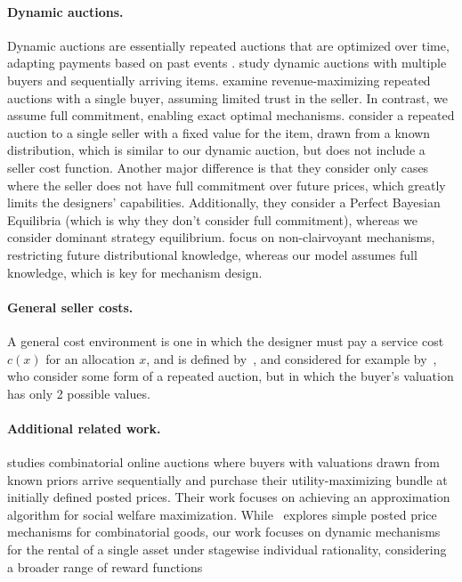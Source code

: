 \documentclass[11pt,letterpaper]{article}
\theoremstyle{plain}
\begin{document}
\paragraph{Dynamic auctions.} Dynamic auctions are essentially repeated auctions that are optimized over time, adapting payments based on past events \cite{bergemann2019dynamic,bergemann2010dynamic}. \cite{MirrokniLTZ19} study dynamic auctions with multiple buyers and sequentially arriving items.
 \cite{0001DMS18}  examine revenue-maximizing repeated auctions with a single buyer, assuming limited trust in the seller. In contrast, we assume full commitment, enabling exact optimal mechanisms.
\cite{DevanurPS15} consider a repeated auction to a single seller with a fixed value for the item, drawn from a known distribution, which is similar to our dynamic auction, but does not include a seller cost function. Another major difference is that they consider only cases where the seller does not have full commitment over future prices, which greatly limits the designers' capabilities. Additionally, they consider a Perfect Bayesian Equilibria (which is why they don't consider full commitment), whereas we consider dominant strategy equilibrium.  \cite{MirrokniLTZ18} focus on non-clairvoyant mechanisms, restricting future distributional knowledge, whereas our model assumes full knowledge, which is key for mechanism design.

\paragraph{General seller costs.} A general cost environment is one in which the designer must pay a service cost $c(x)$ for an allocation $x$, and is defined by~\cite[Chapter 3]{hartline2013mechanism}, and considered for example by~\cite{krahmer2016optimality}, who consider some form of a repeated auction, but in which the buyer's valuation has only 2 possible values.

\paragraph{Additional related work.}
\cite{FeldmanGL15} studies combinatorial online auctions where buyers with valuations drawn from known priors arrive sequentially and purchase their utility-maximizing bundle at initially defined posted prices. Their work focuses on achieving an approximation algorithm for social welfare maximization. While~\cite{FeldmanGL15} explores simple posted price mechanisms for combinatorial goods, our work focuses on dynamic mechanisms for the rental of a single asset under stagewise individual rationality, considering a broader range of reward functions
\end{document}
